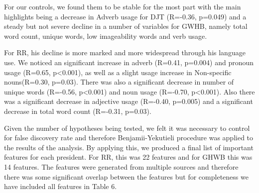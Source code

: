 \documentclass[12pt]{article}
\begin{document}
For our controls, we found them to be stable for the most part with the main highlights being a decrease in Adverb usage for DJT (R=-0.36, p=0.049) and a steady but not severe decline in a number of variables for GWHB, namely total word count, unique words, low imageability words and verb usage.
\par 
For RR, his decline is more marked and more widespread through his language use. We noticed an significant increase in adverb (R=0.41, p=0.004) and pronoun usage (R=0.65, p\textless0.001), as well as a slight usage increase in Non-specific nouns(R=0.30, p=0.03). There was also a significant decrease in number of unique words (R=-0.56, p\textless0.001) and noun usage (R=-0.70, p\textless0.001). Also there was a significant decrease in adjective usage (R=-0.40, p=0.005) and a significant decrease in total word count (R=-0.31, p=0.03). 
\par
Given the number of hypotheses being tested, we felt it was necessary to control for false discovery rate and therefore Benjamii-Yekutieli procedure was applied to the results of the analysis. By applying this, we produced a final list of important features for each president. For RR, this was 22 features and for GHWB this was 14 features.  The features were generated from multiple sources and therefore there was some significant overlap between the features but for completeness we have included all features in Table 6. 
\end{document}

